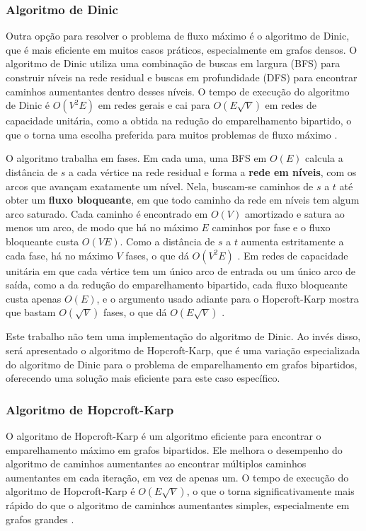 \begin{alineas}
\end{alineas}

\subsubsection{Algoritmo de Dinic}

Outra opção para resolver o problema de fluxo máximo é o algoritmo de Dinic, que é mais eficiente em muitos casos práticos, especialmente em grafos densos. O algoritmo de Dinic utiliza uma combinação de buscas em largura (BFS) para construir níveis na rede residual e buscas em profundidade (DFS) para encontrar caminhos aumentantes dentro desses níveis. O tempo de execução do algoritmo de Dinic é $O(V^2 E)$ em redes gerais e cai para $O(E \sqrt{V})$ em redes de capacidade unitária, como a obtida na redução do emparelhamento bipartido, o que o torna uma escolha preferida para muitos problemas de fluxo máximo \cite{halim}.

O algoritmo trabalha em fases. Em cada uma, uma BFS em $O(E)$ calcula a distância de $s$ a cada vértice na rede residual e forma a \textbf{rede em níveis}, com os arcos que avançam exatamente um nível. Nela, buscam-se caminhos de $s$ a $t$ até obter um \textbf{fluxo bloqueante}, em que todo caminho da rede em níveis tem algum arco saturado. Cada caminho é encontrado em $O(V)$ amortizado e satura ao menos um arco, de modo que há no máximo $E$ caminhos por fase e o fluxo bloqueante custa $O(VE)$. Como a distância de $s$ a $t$ aumenta estritamente a cada fase, há no máximo $V$ fases, o que dá $O(V^2 E)$ \cite{ahuja}. Em redes de capacidade unitária em que cada vértice tem um único arco de entrada ou um único arco de saída, como a da redução do emparelhamento bipartido, cada fluxo bloqueante custa apenas $O(E)$, e o argumento usado adiante para o Hopcroft-Karp mostra que bastam $O(\sqrt{V})$ fases, o que dá $O(E\sqrt{V})$ \cite{ahuja}.

Este trabalho não tem uma implementação do algoritmo de Dinic. Ao invés disso, será apresentado o algoritmo de Hopcroft-Karp, que é uma variação especializada do algoritmo de Dinic para o problema de emparelhamento em grafos bipartidos, oferecendo uma solução mais eficiente para este caso específico.

\subsubsection{Algoritmo de Hopcroft-Karp}

O algoritmo de Hopcroft-Karp é um algoritmo eficiente para encontrar o emparelhamento máximo em grafos bipartidos. Ele melhora o desempenho do algoritmo de caminhos aumentantes ao encontrar múltiplos caminhos aumentantes em cada iteração, em vez de apenas um. O tempo de execução do algoritmo de Hopcroft-Karp é $O(E \sqrt{V})$, o que o torna significativamente mais rápido do que o algoritmo de caminhos aumentantes simples, especialmente em grafos grandes \cite{halim}.

